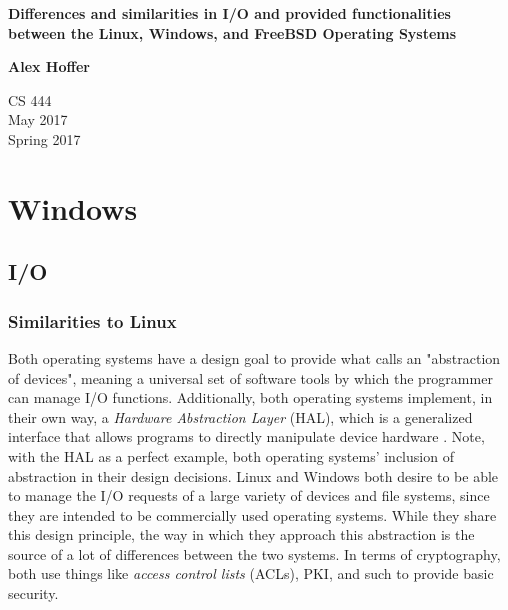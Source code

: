 \documentclass[letterpaper,10pt,titlepage]{article}
\begin{document}
\begin{titlepage}
    \begin{center}
        \vspace*{3.5cm}

        \textbf{Differences and similarities in I/O and provided functionalities between the Linux, Windows, and FreeBSD Operating Systems}

        \vspace{0.5cm}

        \textbf{Alex Hoffer}

        \vspace{0.8cm}

        CS 444\\
        May 2017\\
	Spring 2017\\

        \vfill

    \end{center}
\end{titlepage}

\newpage

\tableofcontents

\newpage



\section{Windows}
\subsection{I/O}
\subsubsection{Similarities to Linux}
Both operating systems have a design goal to provide what \cite{windowsInt2} calls an "abstraction of devices", meaning a universal set of software tools by which the programmer can manage I/O functions. Additionally, both operating systems implement, in their own way, a \emph{Hardware Abstraction Layer} (HAL), which is a generalized interface that allows programs to directly manipulate device hardware \cite{windowsInt1}.
Note, with the HAL as a perfect example, both operating systems' inclusion of abstraction in their design decisions. Linux and Windows both desire to be able to manage the I/O requests of a large variety of devices and file systems, since they are intended to be commercially used operating systems. While they share this design principle, the way in which they approach this abstraction is the source of a lot of differences between the two systems. In terms of cryptography, both use things like \emph{access control lists} (ACLs), PKI, and such to provide basic security. 
\end{document}
